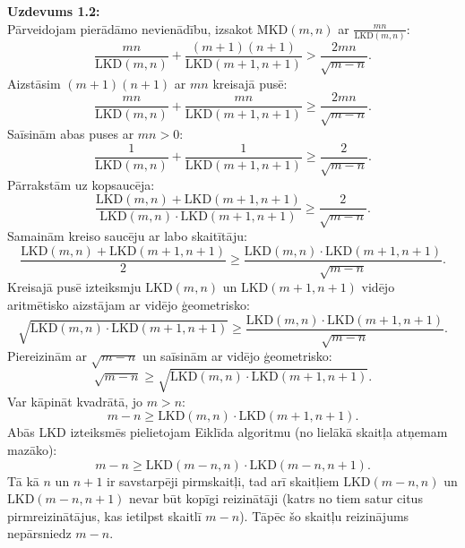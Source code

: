 \documentclass[a4paper,12pt]{article}
\begin{document}
{\bf Uzdevums 1.2:}\\
Pārveidojam pierādāmo nevienādību, izsakot $\mbox{MKD}(m,n)$ ar ${\displaystyle \frac{mn}{\mbox{LKD}(m,n)}}$: 
\begin{equation}
\label{eq:ineq1}
\frac{mn}{\mbox{LKD}(m,n)} + \frac{(m+1)(n+1)}{\mbox{LKD}(m+1,n+1)} > \frac{2mn}{\sqrt{m-n}}.
\end{equation}
Aizstāsim $(m+1)(n+1)$ ar $mn$ kreisajā pusē:
\begin{equation}
\label{eq:ineq2}
\frac{mn}{\mbox{LKD}(m,n)} + \frac{mn}{\mbox{LKD}(m+1,n+1)} \geq \frac{2mn}{\sqrt{m-n}}.
\end{equation}
Saīsinām abas puses ar $mn>0$:
\begin{equation}
\label{eq:ineq3}
\frac{1}{\mbox{LKD}(m,n)} + \frac{1}{\mbox{LKD}(m+1,n+1)} \geq \frac{2}{\sqrt{m-n}}.
\end{equation}
Pārrakstām uz kopsaucēja:
\begin{equation}
\label{eq:ineq4}
\frac{\mbox{LKD}(m,n) + \mbox{LKD}(m+1,n+1)}{\mbox{LKD}(m,n) \cdot \mbox{LKD}(m+1,n+1)} \geq \frac{2}{\sqrt{m-n}}.
\end{equation}
Samainām kreiso saucēju ar labo skaitītāju: 
\begin{equation}
\label{eq:ineq5}
\frac{\mbox{LKD}(m,n) + \mbox{LKD}(m+1,n+1)}{2} \geq \frac{\mbox{LKD}(m,n) \cdot \mbox{LKD}(m+1,n+1)}{\sqrt{m-n}}.
\end{equation}
Kreisajā pusē izteiksmju $\mbox{LKD}(m,n)$ un $\mbox{LKD}(m+1,n+1)$ vidējo aritmētisko aizstājam ar vidējo ģeometrisko:
\begin{equation}
\label{eq:ineq6}
\sqrt{\mbox{LKD}(m,n) \cdot \mbox{LKD}(m+1,n+1)} \geq \frac{\mbox{LKD}(m,n) \cdot \mbox{LKD}(m+1,n+1)}{\sqrt{m-n}}.
\end{equation}
Piereizinām ar $\sqrt{m-n}$ un saīsinām ar vidējo ģeometrisko:
\begin{equation}
\label{eq:ineq7}
\sqrt{m-n} \geq \sqrt{\mbox{LKD}(m,n) \cdot \mbox{LKD}(m+1,n+1)}.
\end{equation}
Var kāpināt kvadrātā, jo $m>n$:
\begin{equation}
\label{eq:ineq8}
m-n \geq \mbox{LKD}(m,n) \cdot \mbox{LKD}(m+1,n+1).
\end{equation}
Abās LKD izteiksmēs pielietojam Eiklīda algoritmu (no lielākā skaitļa atņemam mazāko):
\begin{equation}
\label{eq:ineq9}
m-n \geq \mbox{LKD}(m-n,n) \cdot \mbox{LKD}(m-n,n+1).
\end{equation}
Tā kā $n$ un $n+1$ ir savstarpēji pirmskaitļi, tad arī skaitļiem $\mbox{LKD}(m-n,n)$ un $\mbox{LKD}(m-n,n+1)$ nevar būt 
kopīgi reizinātāji (katrs no tiem satur citus pirmreizinātājus, kas ietilpst skaitlī $m-n$). Tāpēc 
šo skaitļu reizinājums nepārsniedz $m-n$. 
\end{document}
